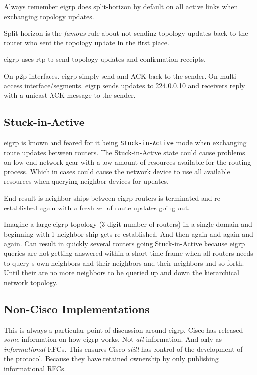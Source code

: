 Always remember \gls{eigrp} does split-horizon by default on all active links when exchanging topology updates.

Split-horizon is the \textit{famous} rule about not sending topology updates back to the router who sent the topology update in the first place.

\gls{eigrp} uses \gls{rtp} to send topology updates and confirmation receipts.

On \gls{p2p} interfaces. \gls{eigrp} simply send and ACK back to the sender.
On multi-access interface/segments. \gls{eigrp} sends updates to 224.0.0.10 and receivers reply with a unicast ACK message to the sender.

\subsection[SIA]{Stuck-in-Active}
\gls{eigrp} is known and feared for it being \texttt{Stuck-in-Active} mode when exchanging route updates between routers. The Stuck-in-Active state could cause problems on low end network gear with a low amount of resources available for the routing process. Which in cases could cause the network device to use all available resources when querying neighbor devices for updates.


End result is neighbor ships between \gls{eigrp} routers is terminated and re-established again with a fresh set of route updates going out.

Imagine a large \gls{eigrp} topology (3-digit number of routers) in a single domain and beginning with 1 neighbor-ship gets re-established. And then again and again and again. Can result in quickly several routers going Stuck-in-Active because \gls{eigrp} queries are not getting answered within a short time-frame when all routers needs to query s own neighbors and their neighbors and their neighbors and so forth. Until their are no more neighbors to be queried up and down the hierarchical network topology.


\subsection{Non-Cisco Implementations}

This is always a particular point of discussion around \gls{eigrp}. Cisco has released \textit{some} information on how \gls{eigrp} works.
Not \textit{all} information.
And only as \textit{informational} RFCs.
This ensures Cisco \textit{still} has control of the development of the protocol.
Because they have retained ownership by only publishing informational RFCs.

